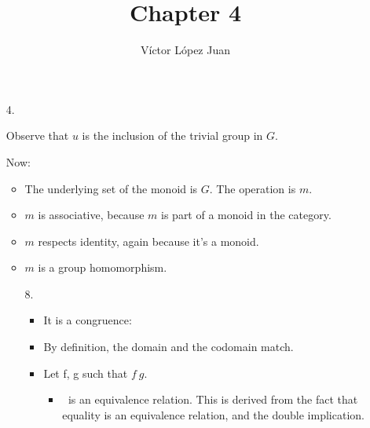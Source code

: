 \documentclass{article}
\author{Víctor López Juan}
\title{Chapter 4}
\begin{document}
\begin{enumerate}
  \item[4.]




    Observe that $u$ is the inclusion of the trivial group in $G$.

    Now:

    \begin{itemize}
      \item The underlying set of the monoid is $G$. The operation is $m$.
      \item $m$ is associative, because $m$ is part of a monoid in the
        category.

      \item $m$ respects identity, again because it's a monoid.

      \item $m$ is a group homomorphism.

        

  \item[8.]

    \begin{itemize}
      \item It is a congruence:


        \item By definition, the domain and the codomain match.
        \item
          Let f, g such that $f ~ g$.
          

          \begin{itemize}
            \item $~$ is an equivalence relation. This is derived from the
              fact that equality is an equivalence relation, and the double
              implication.


\end{itemize}
\end{itemize}
\end{itemize}
\end{enumerate}
\end{document}
